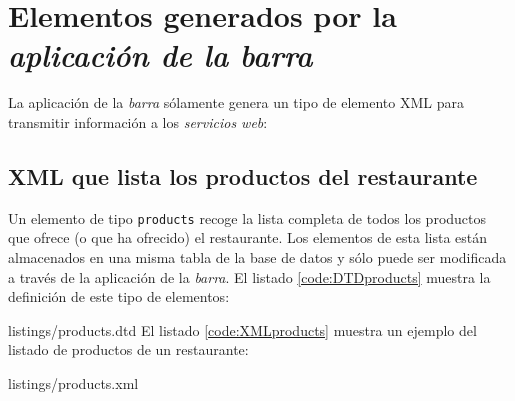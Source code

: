 \section{Elementos generados por la \emph{aplicación de la barra}}
La aplicación de la \emph{barra} sólamente genera un tipo de elemento
\acs{XML} para transmitir información a los \emph{servicios web}:
\subsection{\acs{XML} que lista los productos del restaurante}
Un elemento de tipo \texttt{products} recoge la lista completa de todos los
productos que ofrece (o que ha ofrecido) el restaurante. Los elementos de
esta lista están almacenados en una misma tabla de la base de datos y sólo
puede ser modificada a través de la aplicación de la \emph{barra}. El
listado \ref{code:DTDproducts} muestra la definición de este tipo de elementos:

{listings/products.dtd}
El listado \ref{code:XMLproducts} muestra un ejemplo del listado de productos
de un restaurante:

{listings/products.xml}

